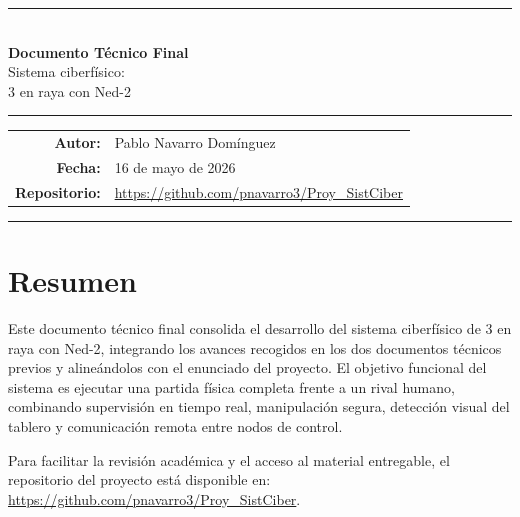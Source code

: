 \documentclass[12pt,a4paper]{article}
\begin{document}
\begin{titlepage}
\centering


\vspace{2cm}

{\color{ullblue}\rule{0.6\linewidth}{0.4pt}}\\[0.6cm]
{\LARGE\bfseries Documento Técnico Final}\\[0.5cm]
{\Large Sistema ciberfísico:\\[0.2cm] 3 en raya con Ned-2}\\[0.6cm]
{\color{ullblue}\rule{0.6\linewidth}{0.4pt}}

\vfill

\begin{tabular}{rl}
  \textbf{Autor:}  & Pablo Navarro Domínguez \\
  \textbf{Fecha:}  & 16 de mayo de 2026 \\
  \textbf{Repositorio:} & \url{https://github.com/pnavarro3/Proy_SistCiber} \\
\end{tabular}

\vspace{1.2cm}
{\color{ullblue}\rule{\linewidth}{1.5pt}}

\end{titlepage}

\thispagestyle{empty}
\setcounter{tocdepth}{2}
\tableofcontents
\newpage

\section{Resumen}
Este documento técnico final consolida el desarrollo del sistema ciberfísico de 3 en raya con Ned-2, integrando los avances recogidos en los dos documentos técnicos previos y alineándolos con el enunciado del proyecto. El objetivo funcional del sistema es ejecutar una partida física completa frente a un rival humano, combinando supervisión en tiempo real, manipulación segura, detección visual del tablero y comunicación remota entre nodos de control.

Para facilitar la revisión académica y el acceso al material entregable, el repositorio del proyecto está disponible en: \url{https://github.com/pnavarro3/Proy_SistCiber}.
\end{document}
